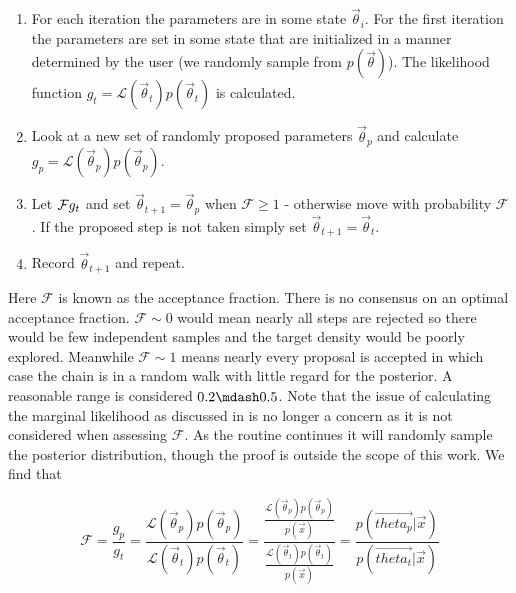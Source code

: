 \begin{enumerate}
\item For each iteration the parameters are in some state $\overrightarrow{\theta}_i$.  For the first iteration the parameters are set
in some state that are initialized in a manner determined by the user (we randomly sample from $p(\overrightarrow{\theta})$).  The
likelihood function $g_t = \mathcal{L}(\overrightarrow{\theta}_t) p(\overrightarrow{\theta}_t)$ is calculated.
\item Look at a new set of randomly proposed parameters $\overrightarrow{\theta}_{p}$ and calculate 
$g_p = \mathcal{L}(\overrightarrow{\theta}_p) p(\overrightarrow{\theta}_p)$.
\item Let $\mathcal{F} \def \frac{g_p}{g_t}$ and set $\overrightarrow{\theta}_{t+1} = \overrightarrow{\theta}_p$ when
$\mathcal{F} \geq 1$ - otherwise move with probability $\mathcal{F}$.  If the proposed step is not taken simply set
$\overrightarrow{\theta}_{t+1} = \overrightarrow{\theta}_t$.
\item Record $\overrightarrow{\theta}_{t+1}$ and repeat.
\end{enumerate}

Here $\mathcal{F}$ is known as the acceptance fraction.  There is no consensus on an optimal acceptance fraction.  $\mathcal{F} {\sim} 0$
would mean nearly all steps are rejected so there would be few independent samples and the target density would be poorly
explored.  Meanwhile $\mathcal{F} {\sim} 1$ means nearly every proposal is accepted in which case the chain is in a random walk with
little regard for the posterior.  A reasonable range is considered $0.2 \mdash 0.5$.  Note that the issue of calculating the marginal
likelihood as discussed in
 is no longer a concern as it is not considered when assessing
$\mathcal{F}$.  As the routine continues it will randomly sample the posterior distribution, though the proof is outside the scope of this
work.  We find that

\begin{equation}
\mathcal{F} = \frac{g_p}{g_t} = \frac{\mathcal{L}(\overrightarrow{\theta}_p) p(\overrightarrow{\theta}_p)}
{\mathcal{L}(\overrightarrow{\theta}_t) p(\overrightarrow{\theta}_t)} = 
\frac{\frac{\mathcal{L}(\overrightarrow{\theta}_p) p(\overrightarrow{\theta}_p)}{p(\overrightarrow{x})}}
{\frac{\mathcal{L}(\overrightarrow{\theta}_t) p(\overrightarrow{\theta}_t)}{p(\overrightarrow{x})}} =
\frac{p(\overrightarrow{theta_p}|\overrightarrow{x})}{p(\overrightarrow{theta_t}|\overrightarrow{x})}
\label{eq:er_nr_calibrations_parameter_determ_mcmc_acc_ratio}
\end{equation}

